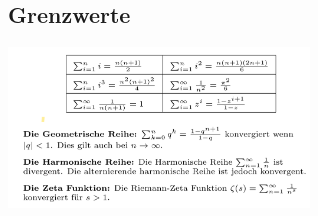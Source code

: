 \documentclass[8pt]{extarticle}
\begin{document}
\begin{multicols*}{3}
\subsection{Grenzwerte}
\begin{center}
\includegraphics[width=8cm]{typischeReihen.png}
\end{center}
\begin{center}
  \begin{tabularx}{\linewidth}{XX}


\end{tabularx}
\end{center}
\end{multicols*}
\end{document}
